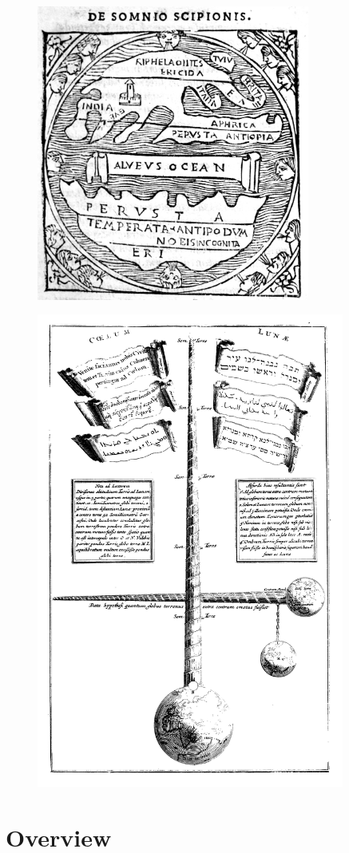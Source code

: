 \begin{figure}
\includegraphics[width=0.8\textwidth]{intro/figures/macrobius.jpg}
\caption[Map of the world according to Macrobius.]{}
\label{fig:macrobius}
\end{figure}
\begin{figure}
\includegraphics[width=0.9\textwidth]{intro/figures/turris_babel.jpg}
\caption[Plate from \emph{Turris Babel} (1679), by Athanasius Kirker.]{}
\label{fig:turris_babel}
\end{figure}


\section{Overview}


